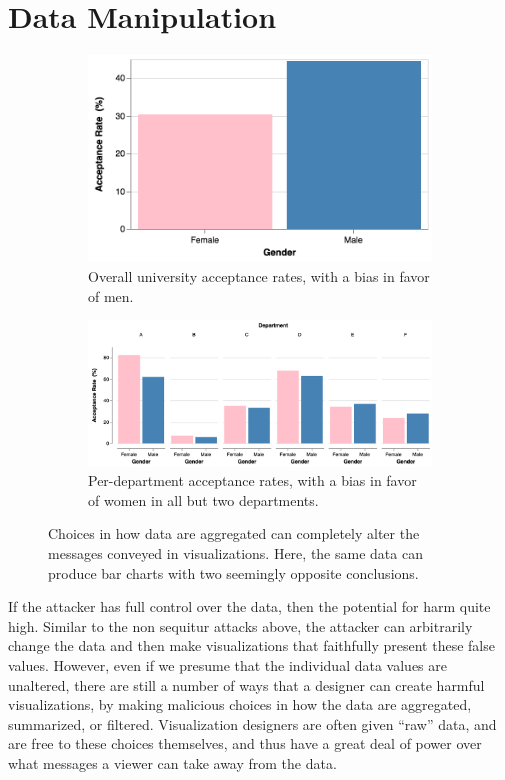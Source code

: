 \documentclass{vgtc}                          %
\begin{document}
\section{Data Manipulation}

\begin{figure}
	\centering
	\begin{subfigure}{0.85\columnwidth}
		\centering
		\includegraphics[width=.45\columnwidth]{pictures/simpson.png}
		\caption{Overall university acceptance rates, with a bias in favor of men.}
	\end{subfigure}
	
	\begin{subfigure}{0.85\columnwidth}
		\includegraphics[width=\textwidth]{pictures/simpson2.png}
		\caption{Per-department acceptance rates, with a bias in favor of women in all but two departments.}
	\end{subfigure}
	\caption{Choices in how data are aggregated can completely alter the messages conveyed in visualizations. Here, the same data can produce bar charts with two seemingly opposite conclusions.}
	\label{fig:simpsons}
\end{figure}

If the attacker has full control over the data, then the potential for harm quite high. Similar to the non sequitur attacks above, the attacker can arbitrarily change the data and then make visualizations that faithfully present these false values. However, even if we presume that the individual data values are unaltered, there are still a number of ways that a designer can create harmful visualizations, by making malicious choices in how the data are aggregated, summarized, or filtered. Visualization designers are often given ``raw'' data, and are free to these choices themselves, and thus have a great deal of power over what messages a viewer can take away from the data.
\end{document}
